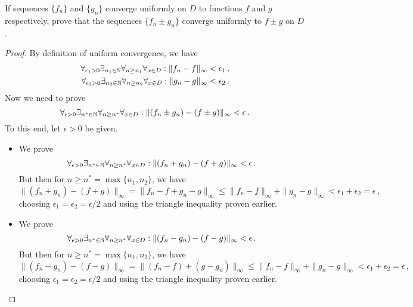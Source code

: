\documentclass[week=5]{homework}
\begin{document}
\begin{questions}
		\question
		\begin{inlinetoprove}
			If sequences $\{f_n \}$ and $\{g_n \}$ converge uniformly on $D$ to functions $f$ and $g$ respectively, prove that the sequences $\{f_n \pm g_n \}$ converge uniformly to $f \pm g$ on $D$.
		\end{inlinetoprove}
		\begin{proof}
			By definition of uniform convergence, we have
			\begin{align*}
				\forall_{\epsilon_1 > 0}\exists_{n_1 \in \naturals}\forall_{n \geq n_1}\forall_{x\in D}: \|f_n - f\|_\infty &< \epsilon_1\,, \\
				\forall_{\epsilon_2 > 0}\exists_{n_2 \in \naturals}\forall_{n \geq n_2}\forall_{x\in D}: \|g_n - g\|_\infty &< \epsilon_2\,.
			\end{align*}
			Now we need to prove
			\[
				\forall_{\epsilon > 0}\exists_{n^* \in \naturals}\forall_{n \geq n^*}\forall_{x\in D}: \|(f_n \pm g_n) - (f \pm g)\|_\infty < \epsilon\,.
			\]
			To this end, let $\epsilon > 0$ be given.
			\begin{itemize}
				\item We prove
				\[
				\forall_{\epsilon > 0}\exists_{n^* \in \naturals}\forall_{n \geq n^*}\forall_{x\in D}: \|(f_n + g_n) - (f + g)\|_\infty < \epsilon\,.
				\]
				But then for $n \geq n^* = \max\{n_1,n_2\}$, we have
				\[
					\|(f_n + g_n) - (f + g)\|_\infty = \|f_n - f + g_n - g\|_\infty \leq \| f_n - f\|_\infty + \| g_n - g \|_\infty < \epsilon_1 + \epsilon_2 = \epsilon\,,
				\]
				choosing $\epsilon_1 = \epsilon_2 = \epsilon/2$ and using the triangle inequality proven earlier.
				
				\item We prove
				\[
				\forall_{\epsilon > 0}\exists_{n^* \in \naturals}\forall_{n \geq n^*}\forall_{x\in D}: \|(f_n - g_n) - (f - g)\|_\infty < \epsilon\,.
				\]
				But then for $n \geq n^* = \max\{n_1,n_2\}$, we have
				\[
				\|(f_n - g_n) - (f - g)\|_\infty = \|(f_n - f )+ (g - g_n)\|_\infty \leq \| f_n - f\|_\infty + \| g_n - g \|_\infty < \epsilon_1 + \epsilon_2 = \epsilon\,,
				\]
				choosing $\epsilon_1 = \epsilon_2 = \epsilon/2$ and using the triangle inequality proven earlier.
			\end{itemize}
		\end{proof}
     \end{questions}
\end{document}
